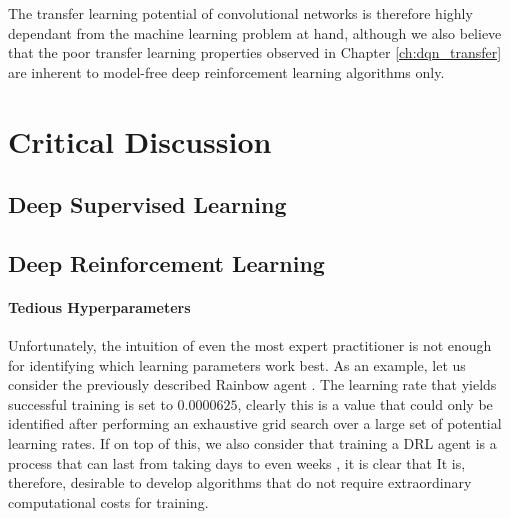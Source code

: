 \begin{enumerate}
The transfer learning potential of convolutional networks is therefore highly dependant from the machine learning problem at hand, although we also believe that the poor transfer learning properties observed in Chapter \ref{ch:dqn_transfer} are inherent to model-free deep reinforcement learning algorithms only.


\end{enumerate}


\section{Critical Discussion}
\label{sec:critical_discussion}

\subsection{Deep Supervised Learning}



\subsection{Deep Reinforcement Learning}
\paragraph{Tedious Hyperparameters}



Unfortunately, the intuition of even the most expert practitioner is not enough for identifying which learning parameters work best. As an example, let us consider the previously described Rainbow agent \cite{hessel2018rainbow}. The learning rate that yields successful training is set to $0.0000625$, clearly this is a value that could only be identified after performing an exhaustive grid search over a large set of potential learning rates. If on top of this, we also consider that training a DRL agent is a process that can last from taking days to even weeks \cite{kaiser2019model}, it is clear that  It is, therefore, desirable to develop algorithms that do not require extraordinary computational costs for training.

